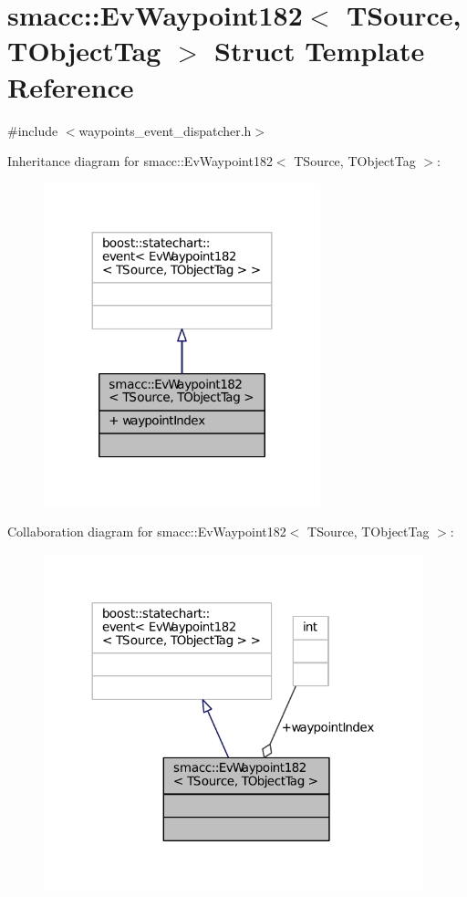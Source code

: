 \hypertarget{structsmacc_1_1EvWaypoint182}{}\section{smacc\+:\+:Ev\+Waypoint182$<$ T\+Source, T\+Object\+Tag $>$ Struct Template Reference}
\label{structsmacc_1_1EvWaypoint182}


{\ttfamily \#include $<$waypoints\+\_\+event\+\_\+dispatcher.\+h$>$}



Inheritance diagram for smacc\+:\+:Ev\+Waypoint182$<$ T\+Source, T\+Object\+Tag $>$\+:
\nopagebreak
\begin{figure}[H]
\begin{center}
\leavevmode
\includegraphics[width=227pt]{structsmacc_1_1EvWaypoint182__inherit__graph}
\end{center}
\end{figure}


Collaboration diagram for smacc\+:\+:Ev\+Waypoint182$<$ T\+Source, T\+Object\+Tag $>$\+:
\nopagebreak
\begin{figure}[H]
\begin{center}
\leavevmode
\includegraphics[width=312pt]{structsmacc_1_1EvWaypoint182__coll__graph}
\end{center}
\end{figure}
